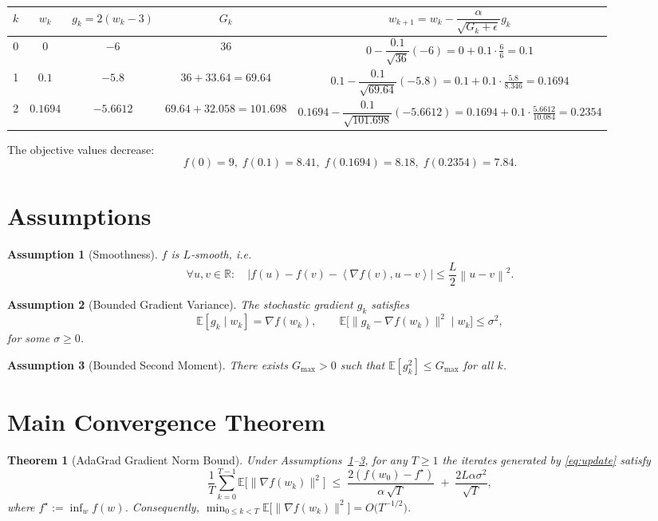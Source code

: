 \documentclass{article}
\newtheorem{theorem}{Theorem}
\newtheorem{assumption}{Assumption}
\newcommand{\E}{\mathbb{E}}
\newcommand{\norm}[1]{\left\|#1\right\|}
\newcommand{\inner}[2]{\left\langle #1,#2\right\rangle}
\begin{document}
\begin{center}
\begin{tabular}{c|c|c|c|c}
$k$ & $w_k$ & $g_k=2(w_k-3)$ & $G_k$ & $w_{k+1}=w_k-\dfrac{\alpha}{\sqrt{G_k+\epsilon}}g_k$\\\hline
0 & $0$ & $-6$ & $36$ & $0-\dfrac{0.1}{\sqrt{36}}(-6)=0+0.1\cdot\frac{6}{6}=0.1$\\
1 & $0.1$ & $-5.8$ & $36+33.64=69.64$ & $0.1-\dfrac{0.1}{\sqrt{69.64}}(-5.8)=0.1+0.1\cdot\frac{5.8}{8.346}=0.1694$\\
2 & $0.1694$ & $-5.6612$ & $69.64+32.058=101.698$ &
$0.1694-\dfrac{0.1}{\sqrt{101.698}}(-5.6612)=0.1694+0.1\cdot\frac{5.6612}{10.084}=0.2354$
\end{tabular}
\end{center}
The objective values decrease:
\[
f(0)=9,\; f(0.1)=8.41,\; f(0.1694)=8.18,\; f(0.2354)=7.84.
\]

\newpage
\section*{Assumptions}
\begin{assumption}[Smoothness]\label{ass:smooth}
$f$ is $L$‑smooth, i.e.
\[
\forall u,v\in\mathbb{R}:\quad |f(u)-f(v)-\inner{\nabla f(v)}{u-v}|\le \frac{L}{2}\norm{u-v}^{2}.
\]
\end{assumption}
\begin{assumption}[Bounded Gradient Variance]\label{ass:variance}
The stochastic gradient $g_k$ satisfies
\[
\E[g_k\mid w_k]=\nabla f(w_k),\qquad 
\E\!\big[\|g_k-\nabla f(w_k)\|^{2}\mid w_k\big]\le\sigma^{2},
\]
for some $\sigma\ge0$.
\end{assumption}
\begin{assumption}[Bounded Second Moment]\label{ass:bound}
There exists $G_{\max}>0$ such that $\E[g_k^{2}]\le G_{\max}$ for all $k$.
\end{assumption}

\section*{Main Convergence Theorem}
\begin{theorem}[AdaGrad Gradient Norm Bound]\label{thm:main}
Under Assumptions~\ref{ass:smooth}–\ref{ass:bound}, for any $T\ge1$ the iterates generated by \eqref{eq:update} satisfy
\[
\frac{1}{T}\sum_{k=0}^{T-1}\E\!\big[\|\nabla f(w_k)\|^{2}\big]
\;\le\;
\frac{2(f(w_0)-f^{\star})}{\alpha\,\sqrt{T}} 
\;+\;
\frac{2L\alpha\sigma^{2}}{ \sqrt{T}},
\]
where $f^{\star}:=\inf_{w}f(w)$.
Consequently, $\displaystyle\min_{0\le k<T}\E\!\big[\|\nabla f(w_k)\|^{2}\big]=O\!\big(T^{-1/2}\big)$.
\end{theorem}
\end{document}
